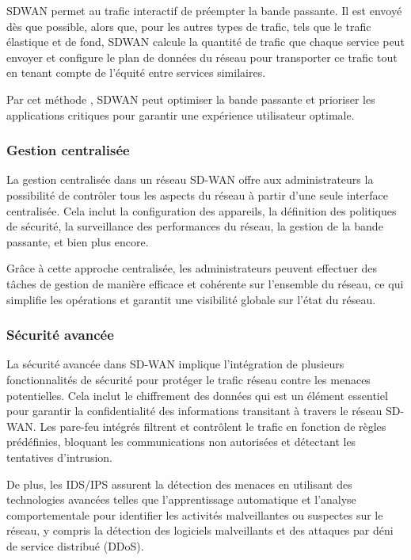 SDWAN permet au trafic interactif de préempter la bande passante. Il est envoyé dès que possible, alors que, pour les autres types de trafic, tels que le trafic élastique et de fond, SDWAN calcule la quantité de trafic que chaque service peut envoyer et configure le plan de données du réseau pour transporter ce trafic tout en tenant compte de l'équité entre services similaires. 

Par cet méthode , SDWAN peut optimiser la bande passante et  prioriser les applications critiques pour garantir une expérience utilisateur optimale.

\subsubsection{Gestion centralisée  }

La gestion centralisée dans un réseau SD-WAN offre aux administrateurs la possibilité de contrôler tous les aspects du réseau à partir d'une seule interface centralisée. Cela inclut la configuration des appareils, la définition des politiques de sécurité, la surveillance des performances du réseau, la gestion de la bande passante, et bien plus encore. 

Grâce à cette approche centralisée, les administrateurs peuvent effectuer des tâches de gestion de manière efficace et cohérente sur l'ensemble du réseau, ce qui simplifie les opérations et garantit une visibilité globale sur l'état du réseau.
\subsubsection{Sécurité avancée   }

La sécurité avancée dans SD-WAN implique l'intégration de plusieurs fonctionnalités de sécurité pour protéger le trafic réseau contre les menaces potentielles. Cela inclut le chiffrement des données qui est un élément  essentiel pour garantir la confidentialité des informations transitant à travers le réseau SD-WAN. Les pare-feu intégrés filtrent et contrôlent le trafic en fonction de règles prédéfinies, bloquant les communications non autorisées et détectant les tentatives d'intrusion.

De plus, les IDS/IPS assurent la détection des menaces en utilisant des technologies avancées telles que l'apprentissage automatique et l'analyse comportementale pour identifier les activités malveillantes ou suspectes sur le réseau, y compris la détection des logiciels malveillants et des attaques par déni de service distribué (DDoS).

